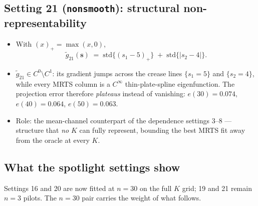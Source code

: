 \documentclass[11pt]{article}
\newcommand{\bs}{\boldsymbol{s}}
\begin{document}
\subsection*{Setting 21 (\texttt{nonsmooth}): structural
non-representability}

\begin{itemize}
\item With $(x)_+ = \max(x, 0)$,
\begin{equation}
\tilde g_{21}(\bs) \;=\; \mathrm{std}\{(s_1 - 5)_+\}
\;+\; \mathrm{std}\{|s_2 - 4|\}.
\label{eq:g21}
\end{equation}
\item $\tilde g_{21} \in C^0 \setminus C^1$: its gradient jumps across the
crease lines $\{s_1 = 5\}$ and $\{s_2 = 4\}$, while every MRTS column is a
$C^\infty$ thin-plate-spline eigenfunction. The projection error therefore
\emph{plateaus} instead of vanishing:
$e(30) = 0.074$, $e(40) = 0.064$, $e(50) = 0.063$.
\item Role: the mean-channel counterpart of the dependence settings 3--8 ---
structure that \emph{no} $K$ can fully represent, bounding the best MRTS fit
away from the oracle at every $K$.
\end{itemize}

\subsection*{What the spotlight settings show}

Settings 16 and 20 are now fitted at $n = 30$ on the full $K$ grid; 19 and 21
remain $n = 3$ pilots. The $n = 30$ pair carries the weight of what follows.
\end{document}
